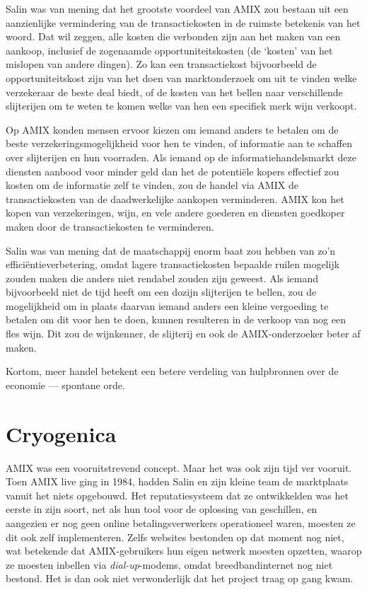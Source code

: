 \documentclass[
  a5paper,
  smalldemyvopaper,11pt,twoside,onecolumn,openright,extrafontsizes]{memoir}
\begin{document}
Salin was van mening dat het grootste voordeel van AMIX zou bestaan uit
een aanzienlijke vermindering van de transactiekosten in de ruimste
betekenis van het woord. Dat wil zeggen, alle kosten die verbonden zijn
aan het maken van een aankoop, inclusief de zogenaamde
opportuniteitskosten (de `kosten' van het mislopen van andere dingen).
Zo kan een transactiekost bijvoorbeeld de opportuniteitskost zijn van
het doen van marktonderzoek om uit te vinden welke verzekeraar de beste
deal biedt, of de kosten van het bellen naar verschillende slijterijen
om te weten te komen welke van hen een specifiek merk wijn verkoopt.

Op AMIX konden mensen ervoor kiezen om iemand anders te betalen om de
beste verzekeringsmogelijkheid voor hen te vinden, of informatie aan te
schaffen over slijterijen en hun voorraden. Als iemand op de
informatiehandelsmarkt deze diensten aanbood voor minder geld dan het de
potentiële kopers effectief zou kosten om de informatie zelf te vinden,
zou de handel via AMIX de transactiekosten van de daadwerkelijke
aankopen verminderen. AMIX kon het kopen van verzekeringen, wijn, en
vele andere goederen en diensten goedkoper maken door de
transactiekosten te verminderen.

Salin was van mening dat de maatschappij enorm baat zou hebben van zo'n
efficiëntieverbetering, omdat lagere transactiekosten bepaalde ruilen
mogelijk zouden maken die anders niet rendabel zouden zijn geweest. Als
iemand bijvoorbeeld niet de tijd heeft om een dozijn slijterijen te
bellen, zou de mogelijkheid om in plaats daarvan iemand anders een
kleine vergoeding te betalen om dit voor hen te doen, kunnen resulteren
in de verkoop van nog een fles wijn. Dit zou de wijnkenner, de slijterij
en ook de AMIX-onderzoeker beter af maken.

Kortom, meer handel betekent een betere verdeling van hulpbronnen over
de economie --- spontane orde.

\section{Cryogenica}\label{cryogenica}

AMIX was een vooruitstrevend concept. Maar het was ook zijn tijd ver
vooruit. Toen AMIX live ging in 1984, hadden Salin en zijn kleine team
de marktplaats vanuit het niets opgebouwd. Het reputatiesysteem dat ze
ontwikkelden was het eerste in zijn soort, net als hun tool voor de
oplossing van geschillen, en aangezien er nog geen online
betalingsverwerkers operationeel waren, moesten ze dit ook zelf
implementeren. Zelfs websites bestonden op dat moment nog niet, wat
betekende dat AMIX-gebruikers hun eigen netwerk moesten opzetten, waarop
ze moesten inbellen via \emph{dial-up}-modems, omdat breedbandinternet
nog niet bestond. Het is dan ook niet verwonderlijk dat het project
traag op gang kwam.
\end{document}
